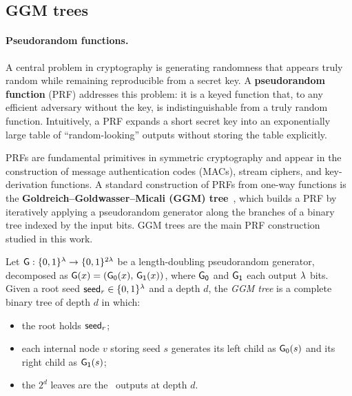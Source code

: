 \subsection{GGM trees}
\paragraph{Pseudorandom functions.}
A central problem in cryptography is generating randomness that appears truly 
random while remaining reproducible from a secret key. A 
\textbf{pseudorandom function} (PRF) addresses this problem: it is a keyed function 
that, to any efficient adversary without the key, is indistinguishable from a truly 
random function. Intuitively, a PRF expands a short secret key into an exponentially 
large table of ``random-looking'' outputs without storing the table explicitly.

PRFs are fundamental primitives in symmetric cryptography and appear in the 
construction of message authentication codes (MACs), stream ciphers, and 
key-derivation functions. 
A standard construction of PRFs from one-way functions is the 
\textbf{Goldreich--Goldwasser--Micali (GGM) tree}~\cite{GGM86}, which builds a 
PRF by iteratively applying a pseudorandom generator along the branches of a 
binary tree indexed by the input bits. GGM trees are the main PRF construction 
studied in this work.


\begin{definition}
\label{def:ggm}
Let $\mathsf{G} : \{0,1\}^{\lambda} \to \{0,1\}^{2\lambda}$ be a length-doubling pseudorandom
generator, decomposed as $\mathsf{G}(x) = (\mathsf{G_0}(x),\, \mathsf{G_1}(x))$, where $\mathsf{G_0}$ and
$\mathsf{G_1}$ each output $\lambda$ bits.  Given a root seed
$\mathsf{seed}_r \in \{0,1\}^{\lambda}$ and a depth $d$, the \emph{GGM tree} is a complete
binary tree of depth $d$ in which:
\begin{itemize}
  \item the root holds $\mathsf{seed}_r$;
  \item each internal node $v$ storing seed $s$ generates its left child as
        $\mathsf{G_0}(s)$ and its right child as $\mathsf{G_1}(s)$;
  \item the $2^{d}$ leaves are the \PRG\ outputs at depth $d$.
\end{itemize}
\end{definition}

